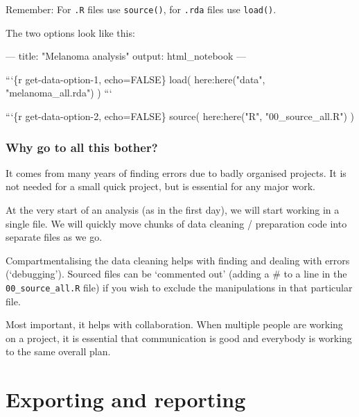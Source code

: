 \documentclass[
  12pt,
  krantz2]{krantz}
\makeatletter
\newenvironment{Shaded}{\begin{snugshade}}{\end{snugshade}}
\newcommand{\BaseNTok}[1]{\textcolor[rgb]{0.00,0.00,0.81}{#1}}
\newcommand{\NormalTok}[1]{#1}
\renewenvironment{quote}{\begin{VF}}{\end{VF}}
\newenvironment{kframe}{%
\medskip{}
\setlength{\fboxsep}{.8em}
 \def\at@end@of@kframe{}%
 \ifinner\ifhmode%
  \def\at@end@of@kframe{\end{minipage}}%
  \begin{minipage}{\columnwidth}%
 \fi\fi%
 \def\FrameCommand##1{\hskip\@totalleftmargin \hskip-\fboxsep
 \colorbox{shadecolor}{##1}\hskip-\fboxsep
     \hskip-\linewidth \hskip-\@totalleftmargin \hskip\columnwidth}%
 \MakeFramed {\advance\hsize-\width
   \@totalleftmargin\z@ \linewidth\hsize
   \@setminipage}}%
 {\par\unskip\endMakeFramed%
 \at@end@of@kframe}
\renewenvironment{Shaded}{\begin{kframe}}{\end{kframe}}
\makeatother
\begin{document}
\begin{quote}
Remember: For \texttt{.R} files use \texttt{source()}, for \texttt{.rda} files use \texttt{load()}.
\end{quote}

The two options look like this:

\begin{Shaded}
\begin{Highlighting}[]
\NormalTok{---}
\NormalTok{title: "Melanoma analysis"}
\NormalTok{output: html_notebook}
\NormalTok{---}

\BaseNTok{```\{r get-data-option-1, echo=FALSE\}}
\BaseNTok{load(}
\BaseNTok{  here:here("data", "melanoma_all.rda")}
\BaseNTok{)}
\BaseNTok{```}

\BaseNTok{```\{r get-data-option-2, echo=FALSE\}}
\BaseNTok{source(}
\BaseNTok{  here:here("R", "00_source_all.R")}
\BaseNTok{)}
\end{Highlighting}
\end{Shaded}

\hypertarget{why-go-to-all-this-bother}{%
\subsection{Why go to all this bother?}\label{why-go-to-all-this-bother}}

It comes from many years of finding errors due to badly organised projects.
It is not needed for a small quick project, but is essential for any major work.

At the very start of an analysis (as in the first day), we will start working in a single file.
We will quickly move chunks of data cleaning / preparation code into separate files as we go.

Compartmentalising the data cleaning helps with finding and dealing with errors (`debugging').
Sourced files can be `commented out' (adding a \# to a line in the \texttt{00\_source\_all.R} file) if you wish to exclude the manipulations in that particular file.

Most important, it helps with collaboration.
When multiple people are working on a project, it is essential that communication is good and everybody is working to the same overall plan.

\hypertarget{chap13-h1}{%
\chapter{Exporting and reporting}\label{chap13-h1}}
\end{document}
